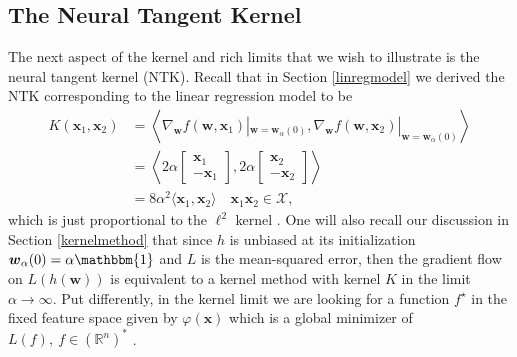 \documentclass{article}
\begin{document}
\subsection{The Neural Tangent Kernel}\label{visualizeNTK}

The next aspect of the kernel and rich limits that we wish to illustrate is the neural tangent kernel (NTK). Recall that in Section \ref{linregmodel} we derived the NTK corresponding to the linear regression model to be
\begin{align*}
K(\boldsymbol{x}_1, \boldsymbol{x}_2) &= \left\langle \nabla_{\boldsymbol{w}}f(\boldsymbol{w}, \boldsymbol{x}_1)|_{\boldsymbol{w} = \boldsymbol{w}_{\alpha}(0)}, \nabla_{\boldsymbol{w}}f(\boldsymbol{w}, \boldsymbol{x}_2)|_{\boldsymbol{w} = \boldsymbol{w}_{\alpha}(0)} \right\rangle\\
&= \left\langle 2\alpha 
    \begin{bmatrix}
        \boldsymbol{x}_1\\
        -\boldsymbol{x}_1
    \end{bmatrix}, 2\alpha 
    \begin{bmatrix}
        \boldsymbol{x}_2\\
        -\boldsymbol{x}_2
    \end{bmatrix} \right\rangle\\
&= 8\alpha^2 \langle \boldsymbol{x}_1, \boldsymbol{x}_2 \rangle \quad \boldsymbol{x}_1 \boldsymbol{x}_2 \in \mathcal{X},
\end{align*}
which is just proportional to the $\ell^2$ kernel \cite{woodworth2020kernel}. One will also recall our discussion in Section \ref{kernelmethod} that since $h$ is unbiased at its initialization $\boldsymbol{w}_{\alpha}(0) = \alpha \mathbbm{1}$ and $L$ is the mean-squared error, then the gradient flow on $L(h(\boldsymbol{w}))$ is equivalent to a kernel method with kernel $K$ in the limit $\alpha \rightarrow \infty$. Put differently, in the kernel limit we are looking for a function $f^{\star}$ in the fixed feature space given by $\varphi(\boldsymbol{x})$ which is a global minimizer of $L(f), \ f \in (\mathbb{R}^n)^*$ \cite{wei2019regularization}.
\end{document}

